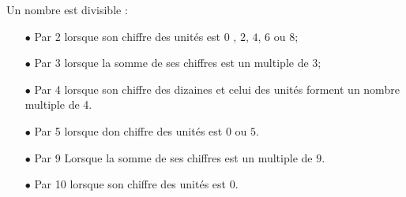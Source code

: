 
Un nombre est divisible :
\begin{itemize}
\item[$\bullet$] Par 2 lorsque son chiffre des unités est $0$ , $2$, $4$, $6$ ou $8$;
\item[$\bullet$] Par 3 lorsque la somme de ses chiffres est un multiple de $3$;
\item[$\bullet$] Par 4 lorsque son chiffre des dizaines et celui des unités forment un nombre multiple de 4.
\item[$\bullet$]Par 5 lorsque don chiffre des unités est $0$ ou $5$.
\item[$\bullet$]Par 9 Lorsque la somme de ses chiffres est un multiple de $9$.
\item[$\bullet$] Par 10 lorsque son chiffre des unités est $0$.
\end{itemize} 